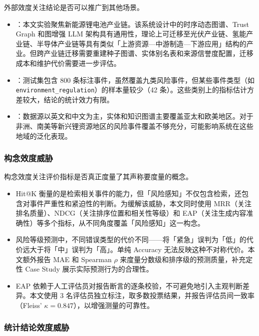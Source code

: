 外部效度关注结论是否可以推广到其他场景。

\begin{itemize}
    \item {}：本文实验聚焦新能源锂电池产业链。该系统设计中的时序动态图谱、Trust Graph 和图增强 LLM 架构具有通用性，理论上可迁移至光伏产业链、氢能产业链、半导体产业链等具有类似「上游资源—中游制造—下游应用」结构的产业。但跨产业链迁移需要重建种子图谱、实体别名表和来源信誉度配置，迁移成本和维护代价需要进一步评估。
    \item {}：测试集包含 800 条标注事件，虽然覆盖九类风险事件，但某些事件类型（如 \texttt{environment\_regulation}）的样本量较少（42 条）。这些类别上的指标估计方差较大，结论的统计效力有限。
    \item {}：数据源以英文和中文为主，实体和知识图谱主要覆盖亚太和欧美地区。对于非洲、南美等新兴锂资源地区的风险事件覆盖不够充分，可能影响系统在这些地域的泛化表现。
\end{itemize}

\subsubsection{构念效度威胁}

构念效度关注评价指标是否真正度量了其声称要度量的概念。

\begin{itemize}
    \item {}Hit@K 衡量的是检索相关事件的能力，但「风险感知」不仅包含检索，还包含对事件严重性和紧迫性的判断。为缓解该威胁，本文同时使用 MRR（关注排名质量）、NDCG（关注排序位置和相关性等级）和 EAP（关注生成内容准确性）等多个指标，从不同角度覆盖「风险感知」这一构念。
    \item {}风险等级预测中，不同错误类型的代价不同——将「紧急」误判为「低」的代价远大于将「中」误判为「高」。单纯 Accuracy 无法反映这种不对称代价。本文额外报告 MAE 和 Spearman $\rho$ 来度量分数级和排序级的预测质量，补充定性 Case Study 展示实际预测行为的合理性。
    \item {}EAP 依赖于人工评估员对报告断言的逐条校验，不可避免地引入主观判断差异。本文使用 3 名评估员独立标注，取多数投票结果，并报告评估员间一致率（Fleiss' $\kappa = 0.847$），以增强测量的可靠性。
\end{itemize}

\subsubsection{统计结论效度威胁}

